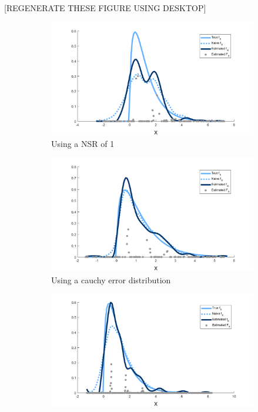 [REGENERATE THESE FIGURE USING DESKTOP]
\begin{figure}
	\begin{subfigure}[b]{0.49\textwidth}
		\centering
		\includegraphics[width = \textwidth]{Figures/Deconvolution/fixed_masses_example_NSR1.png}
		\caption{Using a NSR of 1}
		\label{fig:fixed masses example NSR1}
	\end{subfigure}
	\hfill
	\begin{subfigure}[b]{0.49\textwidth}
		\centering
		\includegraphics[width = \textwidth]{Figures/Deconvolution/fixed_masses_example_Ucauchy.png}
		\caption{Using a cauchy error distribution}
		\label{fig:fixed masses example Ucauchy}
	\end{subfigure}
	\begin{subfigure}[b]{0.49\textwidth}
		\centering
		\includegraphics[width = \textwidth]{Figures/Deconvolution/fixed_masses_example_n10000.png}

\end{subfigure}
\end{figure}
